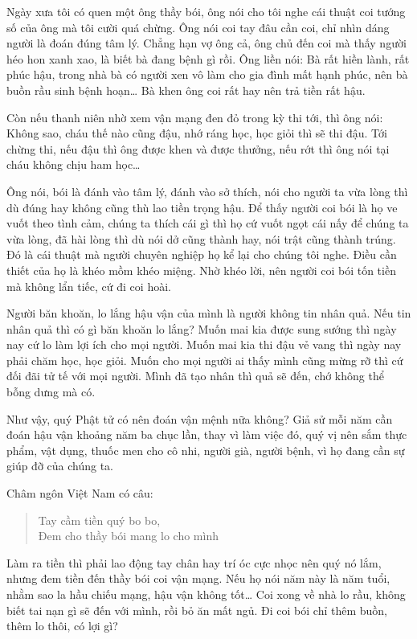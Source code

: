 \documentclass[
  12pt,
  oneside]{book}
\begin{document}
Ngày xưa tôi có quen một ông thầy bói, ông nói cho tôi nghe cái thuật coi tướng số của ông mà tôi cười quá chừng. Ông nói coi tay đâu cần coi, chỉ nhìn dáng người là đoán đúng tâm lý. Chẳng hạn vợ ông cả, ông chủ đến coi mà thấy người héo hon xanh xao, là biết bà đang bệnh gì rồi. Ông liền nói: Bà rất hiền lành, rất phúc hậu, trong nhà bà có người xen vô làm cho gia đình mất hạnh phúc, nên bà buồn rầu sinh bệnh hoạn\ldots{} Bà khen ông coi rất hay nên trả tiền rất hậu.

Còn nếu thanh niên nhờ xem vận mạng đen đỏ trong kỳ thi tới, thì ông nói: Không sao, cháu thế nào cũng đậu, nhớ ráng học, học giỏi thì sẽ thi đậu. Tới chừng thi, nếu đậu thì ông được khen và được thưởng, nếu rớt thì ông nói tại cháu không chịu ham học\ldots{}

Ông nói, bói là đánh vào tâm lý, đánh vào sở thích, nói cho người ta vừa lòng thì dù đúng hay không cũng thù lao tiền trọng hậu. Để thấy người coi bói là họ ve vuốt theo tình cảm, chúng ta thích cái gì thì họ cứ vuốt ngọt cái nấy để chúng ta vừa lòng, đã hài lòng thì dù nói dở cũng thành hay, nói trật cũng thành trúng. Đó là cái thuật mà người chuyên nghiệp họ kể lại cho chúng tôi nghe. Điều cần thiết của họ là khéo mồm khéo miệng. Nhờ khéo lời, nên người coi bói tốn tiền mà không lẩn tiếc, cứ đi coi hoài.

Người băn khoăn, lo lắng hậu vận của mình là người không tin nhân quả. Nếu tin nhân quả thì có gì băn khoăn lo lắng? Muốn mai kia được sung sướng thì ngày nay cứ lo làm lợi ích cho mọi người. Muốn mai kia thi đậu vẻ vang thì ngày nay phải chăm học, học giỏi. Muốn cho mọi người ai thấy mình cũng mừng rỡ thì cứ đối đãi tử tế với mọi người. Mình đã tạo nhân thì quả sẽ đến, chớ không thể bỗng dưng mà có.

Như vậy, quý Phật tử có nên đoán vận mệnh nữa không? Giả sử mỗi năm cần đoán hậu vận khoảng năm ba chục lần, thay vì làm việc đó, quý vị nên sắm thực phẩm, vật dụng, thuốc men cho cô nhi, người già, người bệnh, vì họ đang cần sự giúp đỡ của chúng ta.

Châm ngôn Việt Nam có câu:

\begin{quote}
Tay cầm tiền quý bo bo,\\
Đem cho thầy bói mang lo cho mình
\end{quote}

Làm ra tiền thì phải lao động tay chân hay trí óc cực nhọc nên quý nó lắm, nhưng đem tiền đến thầy bói coi vận mạng. Nếu họ nói năm này là năm tuổi, nhằm sao la hầu chiếu mạng, hậu vận không tốt\ldots{} Coi xong về nhà lo rầu, không biết tai nạn gì sẽ đến với mình, rồi bỏ ăn mất ngủ. Đi coi bói chỉ thêm buồn, thêm lo thôi, có lợi gì?
\end{document}
